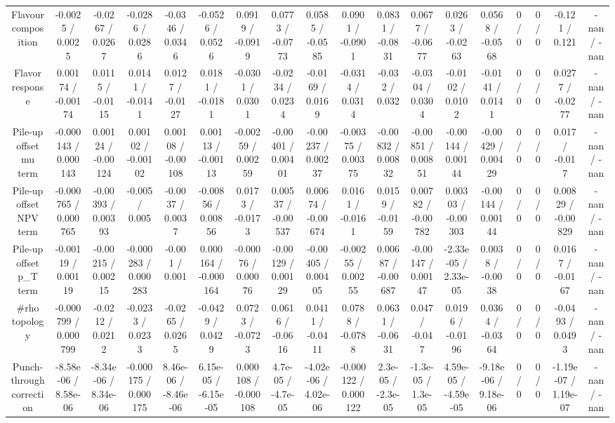 \documentclass[10pt]{article}
\begin{document}
\begin{table}[htbp]
\begin{center}
\begin{tabular}{|c|c|c|c|c|c|c|c|c|c|c|c|c|c|c|c|c|c|}
  Flavour composition & -0.0025 / 0.0025 & -0.0267 / 0.0267 & -0.0286 / 0.0286 & -0.0346 / 0.0346 & -0.0526 / 0.0526 & 0.0919 / -0.0919 & 0.0773 / -0.0773 & 0.0585 / -0.0585 & 0.0901 / -0.0901 & 0.0831 / -0.0831 & 0.0677 / -0.0677 & 0.0263 / -0.0263 & 0.0568 / -0.0568 & 0 / 0 & 0 / 0 & -0.121 / 0.121 & -nan / -nan \\ 
  Flavor response & 0.00174 / -0.00174 & 0.0115 / -0.0115 & 0.0141 / -0.0141 & 0.0127 / -0.0127 & 0.0181 / -0.0181 & -0.0301 / 0.0301 & -0.0234 / 0.0234 & -0.0169 / 0.0169 & -0.0314 / 0.0314 & -0.032 / 0.032 & -0.0304 / 0.0304 & -0.0102 / 0.0102 & -0.0141 / 0.0141 & 0 / 0 & 0 / 0 & 0.0277 / -0.0277 & -nan / -nan \\ 
  Pile-up offset mu term & -0.000143 / 0.000143 & 0.00124 / -0.00124 & 0.00102 / -0.00102 & 0.00108 / -0.00108 & 0.00113 / -0.00113 & -0.00259 / 0.00259 & -0.00401 / 0.00401 & -0.00237 / 0.00237 & -0.00375 / 0.00375 & -0.00832 / 0.00832 & -0.00851 / 0.00851 & -0.00144 / 0.00144 & -0.00429 / 0.00429 & 0 / 0 & 0 / 0 & 0.017 / -0.017 & -nan / -nan \\ 
  Pile-up offset NPV term & -0.000765 / 0.000765 & -0.00393 / 0.00393 & -0.005 / 0.005 & -0.0037 / 0.0037 & -0.00856 / 0.00856 & 0.0173 / -0.0173 & 0.00537 / -0.00537 & 0.00674 / -0.00674 & 0.0161 / -0.0161 & 0.0159 / -0.0159 & 0.00782 / -0.00782 & 0.00303 / -0.00303 & -0.00144 / 0.00144 & 0 / 0 & 0 / 0 & 0.00829 / -0.00829 & -nan / -nan \\ 
  Pile-up offset p_{T} term & -0.00119 / 0.00119 & -0.00215 / 0.00215 & -0.000283 / 0.000283 & -0.001 / 0.001 & 0.000164 / -0.000164 & -0.00076 / 0.00076 & -0.00129 / 0.00129 & -0.00405 / 0.00405 & -0.00255 / 0.00255 & 0.00687 / -0.00687 & -0.00147 / 0.00147 & -2.33e-05 / 2.33e-05 & 0.0038 / -0.0038 & 0 / 0 & 0 / 0 & 0.0167 / -0.0167 & -nan / -nan \\ 
  #rho topology & -0.000799 / 0.000799 & -0.0212 / 0.0212 & -0.0233 / 0.0233 & -0.0265 / 0.0265 & -0.0429 / 0.0429 & 0.0723 / -0.0723 & 0.0616 / -0.0616 & 0.0411 / -0.0411 & 0.0788 / -0.0788 & 0.0631 / -0.0631 & 0.047 / -0.047 & 0.0196 / -0.0196 & 0.0364 / -0.0364 & 0 / 0 & 0 / 0 & -0.0493 / 0.0493 & -nan / -nan \\ 
  Punch-through correction & -8.58e-06 / 8.58e-06 & -8.34e-06 / 8.34e-06 & -0.000175 / 0.000175 & 8.46e-06 / -8.46e-06 & 6.15e-05 / -6.15e-05 & 0.000108 / -0.000108 & 4.7e-05 / -4.7e-05 & -4.02e-06 / 4.02e-06 & -0.000122 / 0.000122 & 2.3e-05 / -2.3e-05 & -1.3e-05 / 1.3e-05 & 4.59e-05 / -4.59e-05 & -9.18e-06 / 9.18e-06 & 0 / 0 & 0 / 0 & -1.19e-07 / 1.19e-07 & -nan / -nan \\ 

\end{tabular}
\end{center}
\end{table}
\end{document}
